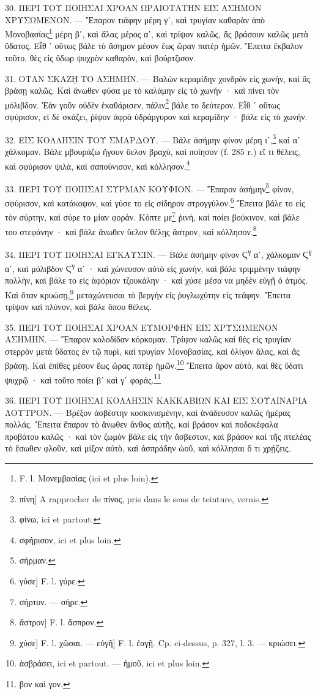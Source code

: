 \documentclass[a4paper, 11pt, oneside, polutonikogreek, french]{article}
\begin{document}
30. ΠΕΡΙ ΤΟΥ ΠΟΙΗΣΑΙ ΧΡΟΑΝ ΩΡΑΙΟΤΑΤΗΝ ΕΙΣ ΑΣΗΜΟΝ ΧΡΥΣΩΜΕΝΟΝ. --- Ἔπαρον τιάφην μέρη γʹ, καὶ τρυγίαν καθαρὰν ἀπὸ Μονοβασίας\footnote{F. l. Mονεμβασίας (ici et plus loin).} μέρη βʹ, καὶ ἅλας μέρος αʹ, καὶ τρίψον καλῶς, ἂς βράσουν καλῶς μετὰ ὕδατος. Εἶθ ᾽ οὕτως βάλε τὸ ἄσημον μέσον ἕως ὥραν πατὲρ ἡμῶν. Ἔπειτα ἔκβαλον τοῦτο, θὲς εἰς ὕδωρ ψυχρὸν καθαρὸν, καὶ βούρτζισον.

31. ΟΤΑΝ ΣΚΑΖῌ ΤΟ ΑΣΗΜΗΝ. --- Βαλὼν κεραμίδην χονδρὸν εἰς χωνὴν, καὶ ἂς βράσῃ καλῶς. Καὶ ἄνωθεν φύσα με τὸ καλάμην εἰς τὸ χωνήν · καὶ πίνει τὸν μόλιβδον. Ἐὰν γοῦν οὐδὲν ἐκαθάρισεν, πάλιν\footnote{πίνη] A rapprocher de πίνος, pris dans le sens de teinture, vernis.} βάλε το δεύτερον. Εἶθ ᾽ οὕτως σφύρισον, εἰ δὲ σκάζει, ῥίψον ἀφρὰ ὑδράργυρον καὶ κεραμίδην · βάλε εἰς τὸ χωνήν.

32. ΕΙΣ ΚΟΛΛΗΣΙΝ ΤΟΥ ΣΜΑΡΔΟΥ. --- Βάλε ἀσήμην φίνον μέρη ιʹ,\footnote{φίνω, ici et partout.} καὶ αʹ χάλκομαν. Βάλε μβουράζω ἤγουν ὕελον βραχὺ, καὶ ποίησον (f. 285 r.) εἴ τι θέλεις, καὶ σφύρισον ψιλὰ, καὶ σαπούνισον, καὶ κόλλησον.\footnote{σφήρισον, ici et plus loin.}

33. ΠΕΡΙ ΤΟΥ ΠΟΙΗΣΑΙ ΣΥΡΜΑΝ ΚΟΥΦΙΟΝ. --- Ἔπαρον ἀσήμην\footnote{σήρμαν.} φίνον, σφύρισον, καὶ κατάκοψον, καὶ γύσε το εἰς σίδηρον στρογγύλον.\footnote{γύσε] F. l. γύρε.} Ἔπειτα βάλε το εἰς τὸν σύρτην, καὶ σύρε το μίαν φοράν. Κόπτε με\footnote{σήρτυν. --- σήρε.} ῥινὴ, καὶ ποίει βούκινον, καὶ βάλε του στεφάνην · καὶ βάλε ἄνωθεν ὕελον θέλῃς ἄστρον, καὶ κόλλησον.\footnote{ἄστρον] F. l. ἄσπρον.}

34. ΠΕΡΙ ΤΟΥ ΠΟΙΗΣΑΙ ΕΓΚΑΥΣΙΝ. --- Βάλε ἀσήμην φίνον Ϛ\textsuperscript{γ} αʹ, χάλκομαν Ϛ\textsuperscript{γ} αʹ, καὶ μόλιβδον Ϛ\textsuperscript{γ} αʹ · καὶ χώνευσον αὐτὸ εἰς χωνὴν, καὶ βάλε τριμμένην τιάφην πολλὴν, καὶ βάλε το εἰς ἀφόριον τζουκάλην · καὶ χύσε μέσα να μηδὲν εὐγῇ ὁ ἀτμός. Καὶ ὅταν κρυώσῃ,\footnote{χύσε] F. l. χῶσαι. --- εὐγῆ] F. l. ἐαγῇ. Cp. ci-dessus, p. 327, l. 3. --- κριώσει.} μεταχώνευσαι τὸ βεργὴν εἰς ῥυγλωχύτην εἰς τεάφην. Ἔπειτα τρίψον καὶ πλύνον, καὶ βάλε ὅπου θέλεις.

35. ΠΕΡΙ ΤΟΥ ΠΟΙΗΣΑΙ ΧΡΟΑΝ ΕΥΜΟΡΦΗΝ ΕΙΣ ΧΡΥΣΩΜΕΝΟΝ ΑΣΗΜΗΝ. --- Ἔπαρον κολοδίδαν κόρκομαν. Τρίψον καλῶς καὶ θὲς εἰς τρυγίαν στερρὸν μετὰ ὕδατος ἐν τῷ πυρὶ, καὶ τρυγίαν Μονοβασίας, καὶ ὀλίγον ἅλας, καὶ ἂς βράσῃ. Καὶ ἐπίθες μέσον ἕως ὥρας πατὲρ ἡμῶν.\footnote{ἀσβράσει, ici et partout. --- ἠμοῦ, ici et plus loin.} Ἔπειτα ἄρον αὐτὸ, καὶ θὲς ὕδατι ψυχρῷ · καὶ τοῦτο ποίει βʹ καὶ γʹ φοράς.\footnote{βον καὶ γον.}

36. ΠΕΡΙ ΤΟΥ ΠΟΙΗΣΑΙ ΚΟΛΛΗΣΙΝ ΚΑΚΚΑΒΙΩΝ ΚΑΙ ΕΙΣ ΣΟΥΛΙΝΑΡΙΑ ΛΟΥΤΡΟΝ. --- Βρέξον ἀσβέστην κοσκινισμένην, καὶ ἀνάδευσον καλῶς ἡμέρας πολλάς. Ἔπειτα ἔπαρον τὸ ἄνωθεν ἄνθος αὐτῆς, καὶ βράσον καὶ ποδοκέφαλα προβάτου καλῶς · καὶ τὸν ζωμὸν βάλε εἰς τὴν ἄσβεστον, καὶ βράσον καὶ τῆς πτελέας τὸ ἔσωθεν φλοῦν, καὶ μίξον αὐτὸ, καὶ ἀσπράδην ὠοῦ, καὶ κόλλησαι ὅ τι χρῄζεις.
\end{document}
